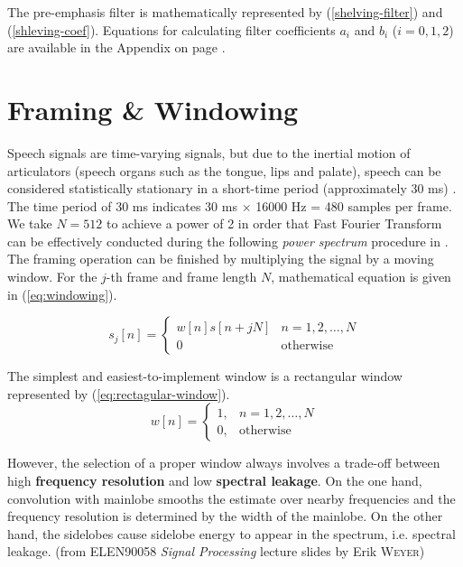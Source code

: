 The pre-emphasis filter is mathematically represented by (\ref{shelving-filter}) and (\ref{shleving-coef}). Equations for calculating filter coefficients $a_i$ and $b_i$ ($i = 0, 1, 2$) are available in the Appendix on page \pageref{shelving-appendix}.


\section{Framing \& Windowing}

Speech signals are time-varying signals, but due to the inertial motion of articulators (speech organs such as the tongue, lips and palate), speech can be considered statistically stationary in a short-time period (approximately 30 ms) \cite{brandstein1995practical}. The time period of 30 ms indicates 30 ms $\times$ 16000 Hz = 480 samples per frame. We take $N = 512$ to achieve a power of 2 in order that Fast Fourier Transform can be effectively conducted during the following \textit{power spectrum} procedure in .\\

The framing operation can be finished by multiplying the signal by a moving window. For the $j$-th frame and frame length $N$, mathematical equation is given in (\ref{eq:windowing}).

\begin{equation}
\label{eq:windowing}
s_j[n] =
\begin{cases}
w[n] s[n+jN] & n = 1, 2, \dots, N\\
0 & \text{otherwise}
\end{cases}
\end{equation}

The simplest and easiest-to-implement window is a rectangular window represented by (\ref{eq:rectagular-window}).
\begin{equation}
\label{eq:rectagular-window}
w[n] =
\begin{cases}
1, & n = 1, 2, \dots, N\\
0, & \text{otherwise}
\end{cases}
\end{equation}

However, the selection of a proper window always involves a trade-off between high \textbf{frequency resolution} and low \textbf{spectral leakage}. On the one hand, convolution with mainlobe smooths the estimate over nearby frequencies and the frequency resolution is determined by the width of the mainlobe. On the other hand, the sidelobes cause sidelobe energy to appear in the spectrum, i.e. spectral leakage. (from ELEN90058 \textit{Signal Processing} lecture slides by Erik \textsc{Weyer})

